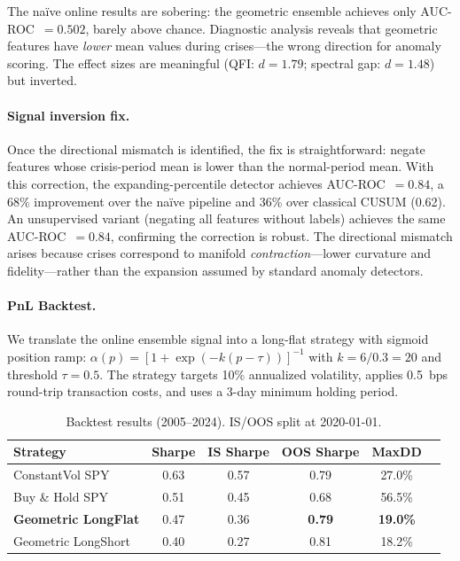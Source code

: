 The na\"ive online results are sobering: the geometric ensemble achieves
only AUC-ROC~$= 0.502$, barely above chance.  Diagnostic analysis
reveals that geometric features have \emph{lower} mean values during
crises---the wrong direction for anomaly scoring.  The effect sizes are
meaningful (QFI: $d = 1.79$; spectral gap: $d = 1.48$) but inverted.

\paragraph{Signal inversion fix.}
Once the directional mismatch is identified, the fix is straightforward:
negate features whose crisis-period mean is lower than the normal-period
mean.  With this correction, the expanding-percentile detector achieves
AUC-ROC~$= 0.84$, a 68\% improvement over the na\"ive pipeline and 36\%
over classical CUSUM (0.62).  An unsupervised variant (negating all
features without labels) achieves the same AUC-ROC~$= 0.84$,
confirming the correction is robust.  The directional mismatch arises
because crises correspond to manifold \emph{contraction}---lower
curvature and fidelity---rather than the expansion assumed by standard
anomaly detectors.

\paragraph{PnL Backtest.}
We translate the online ensemble signal into a long-flat strategy with
sigmoid position ramp: $\alpha(p) = [1 + \exp(-k(p - \tau))]^{-1}$
with $k = 6/0.3 = 20$ and threshold $\tau = 0.5$.  The strategy targets
10\% annualized volatility, applies 0.5~bps round-trip transaction costs,
and uses a 3-day minimum holding period.

\begin{table}[htb]
\centering
\caption{Backtest results (2005--2024).  IS/OOS split at 2020-01-01.}
\label{tab:backtest}
\small
\begin{tabular}{lccccc}
\toprule
Strategy & Sharpe & IS Sharpe & OOS Sharpe & MaxDD \\
\midrule
ConstantVol SPY       & 0.63 & 0.57 & 0.79 & 27.0\% \\
Buy \& Hold SPY       & 0.51 & 0.45 & 0.68 & 56.5\% \\
\textbf{Geometric LongFlat} & 0.47 & 0.36 & \textbf{0.79} & \textbf{19.0\%} \\
Geometric LongShort   & 0.40 & 0.27 & 0.81 & 18.2\% \\
\bottomrule
\end{tabular}
\end{table}

